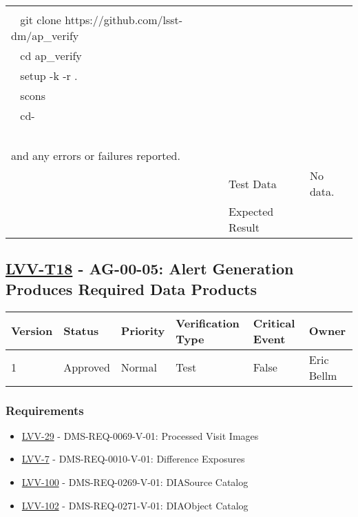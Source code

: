\begin{longtable}[]{p{1.3cm}p{2cm}p{13cm}}
\begin{minipage}[t]{13cm}
{\hspace*{0.333em} ~\\
\hspace*{0.333em} ~ git clone https://github.com/lsst-dm/ap\_verify\\
\hspace*{0.333em} ~ cd ap\_verify\\
\hspace*{0.333em} ~ setup -k -r .\\
\hspace*{0.333em} ~ scons\\
\hspace*{0.333em} ~ cd-\\
~\\
and any errors or failures reported.

            \vspace{\dp0}
            } \end{minipage} \\ \cline{2-3}
            & Test Data &
            \begin{minipage}[t]{13cm}{\footnotesize
                No data.
                \vspace{\dp0}
            } \end{minipage} \\ \cline{2-3}
            & Expected Result &
        \\ \midrule
    \end{longtable}

\subsection{\href{https://jira.lsstcorp.org/secure/Tests.jspa\#/testCase/LVV-T18}{LVV-T18}
    - AG-00-05: Alert Generation Produces Required Data Products}\label{lvv-t18}

\begin{longtable}[]{llllll}
\toprule
Version & Status & Priority & Verification Type & Critical Event & Owner
\\\midrule
1 & Approved & Normal &
Test & False & Eric Bellm
\\\bottomrule
\end{longtable}

\subsubsection{Requirements}
\begin{itemize}
\item \href{https://jira.lsstcorp.org/browse/LVV-29}{LVV-29} - DMS-REQ-0069-V-01: Processed Visit Images
\item \href{https://jira.lsstcorp.org/browse/LVV-7}{LVV-7} - DMS-REQ-0010-V-01: Difference Exposures
\item \href{https://jira.lsstcorp.org/browse/LVV-100}{LVV-100} - DMS-REQ-0269-V-01: DIASource Catalog
\item \href{https://jira.lsstcorp.org/browse/LVV-102}{LVV-102} - DMS-REQ-0271-V-01: DIAObject Catalog
\end{itemize}

